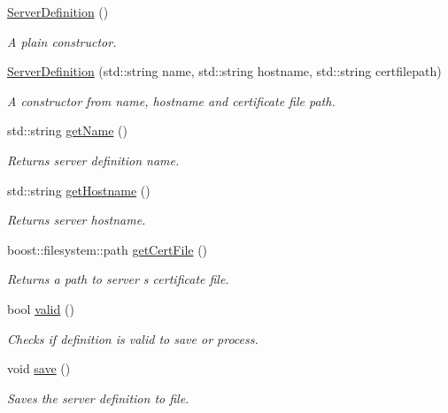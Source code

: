\begin{DoxyCompactItemize}
\item 
\hypertarget{class_r_c_f_1_1_client_1_1_server_definition_aac5283639c40891522960d6223bdc10d}{}\hyperlink{class_r_c_f_1_1_client_1_1_server_definition_aac5283639c40891522960d6223bdc10d}{Server\+Definition} ()\label{class_r_c_f_1_1_client_1_1_server_definition_aac5283639c40891522960d6223bdc10d}

\begin{DoxyCompactList}\small\item\em A plain constructor. \end{DoxyCompactList}\item 
\hyperlink{class_r_c_f_1_1_client_1_1_server_definition_a8492b1915c3014b9111fd884160a3bf1}{Server\+Definition} (std\+::string name, std\+::string hostname, std\+::string certfilepath)
\begin{DoxyCompactList}\small\item\em A constructor from name, hostname and certificate file path. \end{DoxyCompactList}\item 
std\+::string \hyperlink{class_r_c_f_1_1_client_1_1_server_definition_a20f355baa25a4945373051b6d6c70efd}{get\+Name} ()
\begin{DoxyCompactList}\small\item\em Returns server definition name. \end{DoxyCompactList}\item 
std\+::string \hyperlink{class_r_c_f_1_1_client_1_1_server_definition_aa7ad5f20250bf2fa557920ef1991e76f}{get\+Hostname} ()
\begin{DoxyCompactList}\small\item\em Returns server hostname. \end{DoxyCompactList}\item 
boost\+::filesystem\+::path \hyperlink{class_r_c_f_1_1_client_1_1_server_definition_a3cb06170956a9bd97523bf54cdee6ab6}{get\+Cert\+File} ()
\begin{DoxyCompactList}\small\item\em Returns a path to server\textquotesingle{} s certificate file. \end{DoxyCompactList}\item 
bool \hyperlink{class_r_c_f_1_1_client_1_1_server_definition_afb97f6e4203ea56890a9b4bdc99ea45c}{valid} ()
\begin{DoxyCompactList}\small\item\em Checks if definition is valid to save or process. \end{DoxyCompactList}\item 
\hypertarget{class_r_c_f_1_1_client_1_1_server_definition_a20ab01827effdf4b5648e0c162766b1e}{}void \hyperlink{class_r_c_f_1_1_client_1_1_server_definition_a20ab01827effdf4b5648e0c162766b1e}{save} ()\label{class_r_c_f_1_1_client_1_1_server_definition_a20ab01827effdf4b5648e0c162766b1e}

\begin{DoxyCompactList}\small\item\em Saves the server definition to file. \end{DoxyCompactList}\end{DoxyCompactItemize}
